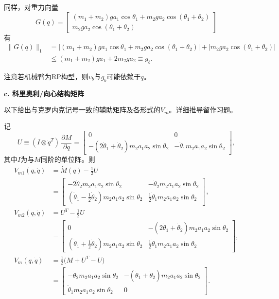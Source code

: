 \documentclass[12pt,a4paper]{ctexart}
\begin{document}
同样，对重力向量
\begin{equation}
G(q) = \begin{bmatrix} (m_1+m_2)ga_1\cos\theta_1 + m_2ga_2\cos(\theta_1+\theta_2) \\ m_2ga_2\cos(\theta_1+\theta_2) \end{bmatrix}
\end{equation}
有
\begin{equation}
\begin{aligned}
\|G(q)\|_1 &= \bigl|(m_1+m_2)ga_1\cos\theta_1 + m_2ga_2\cos(\theta_1+\theta_2)\bigr| + \bigl|m_2ga_2\cos(\theta_1+\theta_2)\bigr| \\
&\leq (m_1+m_2)ga_1 + 2m_2ga_2 \equiv g_b.
\end{aligned}
\end{equation}

注意若机械臂为RP构型，则$v_b$与$g_b$可能依赖于$q$。

\textbf{c. 科里奥利/向心结构矩阵}

以下给出与克罗内克记号一致的辅助矩阵及各形式的$V_m$。详细推导留作习题。

记
\begin{equation}
U \equiv (I \otimes \dot{q}^T)\,\frac{\partial M}{\partial q}
 = \begin{bmatrix} 0 & 0 \\ -(2\dot{\theta}_1 + \dot{\theta}_2)m_2a_1a_2\sin\theta_2 & -\dot{\theta}_1 m_2a_1a_2\sin\theta_2 \end{bmatrix},
\end{equation}
其中$I$为与$M$同阶的单位阵。则
\begin{align}
V_{m1}(q,\dot{q}) &= \dot{M}(q) - \tfrac{1}{2}U \nonumber\\
&= \begin{bmatrix} -2\dot{\theta}_2 m_2a_1a_2\sin\theta_2 & -\dot{\theta}_2 m_2a_1a_2\sin\theta_2 \\[2pt] (\dot{\theta}_1 - \tfrac{1}{2}\dot{\theta}_2) m_2a_1a_2\sin\theta_2 & \tfrac{1}{2}\dot{\theta}_1 m_2a_1a_2\sin\theta_2 \end{bmatrix}, \\[6pt]
V_{m2}(q,\dot{q}) &= U^T - \tfrac{1}{2}U \nonumber\\
&= \begin{bmatrix} 0 & -(2\dot{\theta}_1 + \dot{\theta}_2) m_2a_1a_2\sin\theta_2 \\[2pt] (\dot{\theta}_1 + \tfrac{1}{2}\dot{\theta}_2) m_2a_1a_2\sin\theta_2 & \tfrac{1}{2}\dot{\theta}_1 m_2a_1a_2\sin\theta_2 \end{bmatrix}, \\[6pt]
V_m(q,\dot{q}) &= \tfrac{1}{2}\bigl(\dot{M} + U^T - U\bigr) \nonumber\\
&= \begin{bmatrix} -\dot{\theta}_2 m_2a_1a_2\sin\theta_2 & -(\dot{\theta}_1 + \dot{\theta}_2) m_2a_1a_2\sin\theta_2 \\[2pt] \dot{\theta}_1 m_2a_1a_2\sin\theta_2 & 0 \end{bmatrix}.
\end{align}
\end{document}
